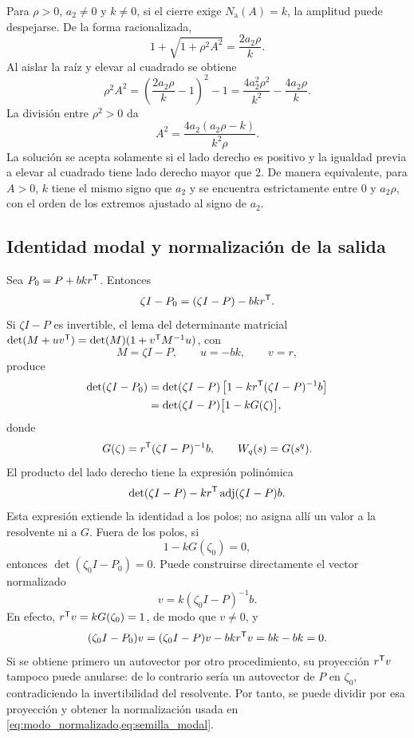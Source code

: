 Para \(\rho>0\), \(a_2\ne0\) y \(k\ne0\), si el cierre exige
\(N_{\mathrm a}(A)=k\), la amplitud puede despejarse.
De la forma racionalizada,
\[
1+\sqrt{1+\rho^2A^2}=\frac{2a_2\rho}{k}.
\]
Al aislar la raíz y elevar al cuadrado se obtiene
\[
 \rho^2A^2
 =\left(\frac{2a_2\rho}{k}-1\right)^2-1
 =\frac{4a_2^2\rho^2}{k^2}-\frac{4a_2\rho}{k}.
\]
La división entre \(\rho^2>0\) da
\begin{equation}
A^2
=\frac{4a_2(a_2\rho-k)}{k^2\rho}.
\label{eq:amplitud_arctan}
\end{equation}
La solución se acepta solamente si el lado derecho es positivo y la igualdad
previa a elevar al cuadrado tiene lado derecho mayor que \(2\). De manera
equivalente, para \(A>0\), \(k\) tiene el mismo signo que \(a_2\) y se
encuentra estrictamente entre \(0\) y \(a_2\rho\), con el orden de los
extremos ajustado al signo de \(a_2\).

\fi
\ifnum{}\relax
\subsection{Identidad modal y normalización de la salida}
\label{app:identidad_modal}

Sea \(P_0=P+bkr^{\mathsf T}\). Entonces
\[
\zeta I-P_0=(\zeta I-P)-bkr^{\mathsf T}.
\]
Si \(\zeta I-P\) es invertible, el lema del determinante matricial
\(\det(M+uv^{\mathsf T})=\det(M)(1+v^{\mathsf T}M^{-1}u)\), con
\[
M=\zeta I-P,\qquad u=-bk,\qquad v=r,
\]
produce
\begin{align}
\det(\zeta I-P_0)
&=\det(\zeta I-P)
\left[1-kr^{\mathsf T}(\zeta I-P)^{-1}b\right]\nonumber\\
&=\det(\zeta I-P)\bigl[1-kG(\zeta)\bigr],
\label{eq:lema_determinante_aplicado}
\end{align}
donde
\[
G(\zeta)=r^{\mathsf T}(\zeta I-P)^{-1}b,
\qquad W_q(s)=G(s^q).
\]
El producto del lado derecho tiene la expresión polinómica
\[
 \det(\zeta I-P)-k r^{\mathsf T}\operatorname{adj}(\zeta I-P)b.
\]
Esta expresión extiende la identidad a los polos; no asigna allí un valor
a la resolvente ni a \(G\). Fuera de los polos, si
\[
1-kG(\zeta_0)=0,
\]
entonces \(\det(\zeta_0I-P_0)=0\). Puede construirse directamente el
vector normalizado
\[
 v=k(\zeta_0I-P)^{-1}b.
\]
En efecto, \(r^{\mathsf T}v=kG(\zeta_0)=1\), de modo que \(v\ne0\), y
\[
 (\zeta_0I-P_0)v
 =(\zeta_0I-P)v-bkr^{\mathsf T}v=bk-bk=0.
\]
Si se obtiene primero un autovector por otro procedimiento, su proyección
\(r^{\mathsf T}v\) tampoco puede anularse: de lo contrario sería un
autovector de \(P\) en \(\zeta_0\), contradiciendo la invertibilidad
del resolvente. Por tanto, se puede dividir por esa proyección y obtener
la normalización usada en \cref{eq:modo_normalizado,eq:semilla_modal}.

